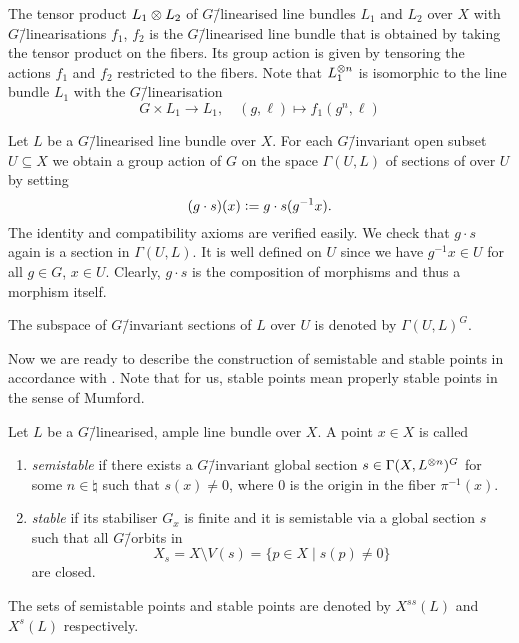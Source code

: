 \begin{remark}
	\label{remark:linearised_line_bundle_tensor}
	The tensor product $L_1 \otimes L_2$ of $G$\=/linearised line bundles $L_1$ and $L_2$ over $X$ with $G$\=/linearisations $f_1$, $f_2$ is the $G$\=/linearised line bundle that is obtained by taking the tensor product on the fibers. Its group action is given by tensoring the actions $f_1$ and $f_2$ restricted to the fibers. Note that $L_1^{\otimes n}$ is isomorphic to the line bundle $L_1$ with the $G$\=/linearisation
	$$G\times L_1 \longrightarrow L_1,\quad (g, \ell) \mapsto f_1(g^n, \ell)$$
\end{remark}

\begin{remark}
	Let $L$ be a $G$\=/linearised line bundle over $X$. For each $G$\=/invariant open subset $U\subseteq X$ we obtain a group action of $G$ on the space $\Gamma(U,L)$ of sections of over $U$ by setting
	$$(g\cdot s)(x) \mathrel{\mathop:}= g\cdot s(g^{-1}x).$$
	The identity and compatibility axioms are verified easily. We check that $g\cdot s$ again is a section in $\Gamma(U,L)$. It is well defined on $U$ since we have $g^{-1}x\in U$ for all $g\in G$, $x\in U$. Clearly, $g\cdot s$ is the composition of morphisms and thus a morphism itself.
	
	The subspace of $G$\=/invariant sections of $L$ over $U$ is denoted by $\Gamma(U,L)^G$.
\end{remark}

Now we are ready to describe the construction of semistable and stable points in accordance with \cite[Definition 1.7 \& 1.8]{git}. Note that for us, stable points mean properly stable points in the sense of Mumford.

\begin{defi}
	Let $L$ be a $G$\=/linearised, ample line bundle over $X$. A point $x\in X$ is called
	\begin{enumerate}[label={\upshape(\roman*)}]
		\item \emph{semistable} if there exists a $G$\=/invariant global section $s\in\Gamma(X,L^{\otimes n})^G$ for some $n\in\natural$ such that $s(x)\neq 0$, where $0$ is the origin in the fiber $\pi^{-1}(x)$.
		\item \emph{stable} if its stabiliser $G_x$ is finite and it is semistable via a global section $s$ such that all $G$\=/orbits in 
		$$X_s = X\setminus V(s) = \{p\in X\mid s(p) \neq 0 \}$$
		are closed.
	\end{enumerate}
	The sets of semistable points and stable points are denoted by $X^{ss}(L)$ and $X^{s}(L)$ respectively.
\end{defi}

